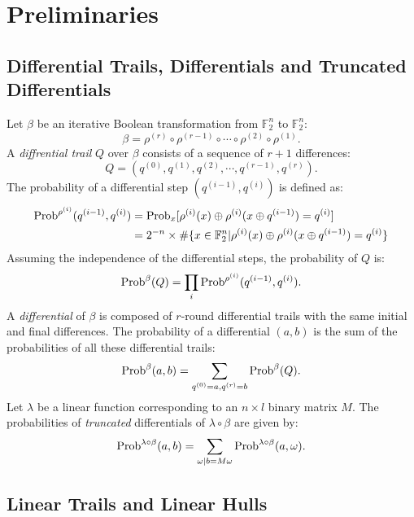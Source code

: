 \section{Preliminaries\label{sec:pre}}

\subsection{Differential Trails, Differentials and Truncated Differentials \cite{DR02}}

Let $\beta$ be an iterative Boolean transformation from $\mathbb{F}_2^n$ to $\mathbb{F}_2^n$: 
\[
    \beta=\rho^{(r)}\circ\rho^{(r-1)}\circ\cdots\circ\rho^{(2)}\circ\rho^{(1)}.
\]
A \textit{diffrential trail} $Q$ over $\beta$ consists of a sequence of $r+1$ differences:
\[
    Q=(q^{(0)},q^{(1)},q^{(2)},\cdots,q^{(r-1)},q^{(r)}).
\]
The probability of a differential step $(q^{(i-1)},q^{(i)})$ is defined as:
\begin{align*}
    \text{Prob}^{\rho^{(i)}}(q^{(i-1)},q^{(i)})&=\text{Prob}_x[\rho^{(i)}(x)\oplus\rho^{(i)}(x\oplus q^{(i-1)})=q^{(i)}]\\
    &=2^{-n}\times\#\{x\in \mathbb{F}_2^n|\rho^{(i)}(x)\oplus\rho^{(i)}(x\oplus q^{(i-1)})=q^{(i)}\}
\end{align*}
Assuming the independence of the differential steps, the probability of $Q$ is:
\[
    \text{Prob}^{\beta}(Q)=\prod\limits_i\text{Prob}^{\rho^{(i)}}(q^{(i-1)},q^{(i)}).
\]
A \textit{differential} of $\beta$ is composed of $r$-round differential trails with the same initial and final differences. The probability of a differential $(a,b)$ is the sum of the probabilities of all these differential trails:
\[
    \text{Prob}^{\beta}(a,b)=\sum\limits_{q^{(0)}=a,q^{(r)}=b}\text{Prob}^{\beta}(Q).
\]
Let $\lambda$ be a linear function corresponding to an $n\times l$ binary matrix $M$. The probabilities of \textit{truncated} differentials of $\lambda\circ\beta$ are given by:
\[
    \text{Prob}^{\lambda\circ\beta}(a,b)=\sum\limits_{\omega|b=M\omega}\text{Prob}^{\lambda\circ\beta}(a,\omega).
\]

\subsection{Linear Trails and Linear Hulls \cite{DR02}}

